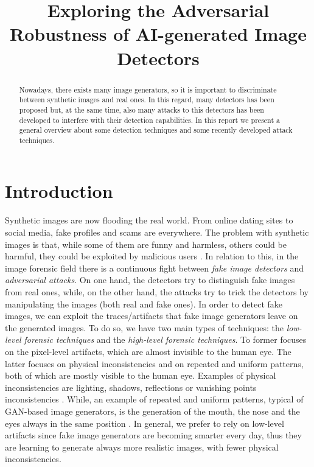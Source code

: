 \documentclass[conference]{IEEEtran} %
\begin{document}

\title{Exploring the Adversarial Robustness of AI-generated Image Detectors}

\author{
}

\maketitle

\begin{abstract}
    Nowadays, there exists many image generators, so it is important to discriminate between synthetic images and real ones. In this regard, many detectors has been proposed but, at the same time, also many attacks to this detectors has been developed to interfere with their detection capabilities. In this report we present a general overview about some detection techniques and some recently developed attack techniques. 
\end{abstract}

\section{Introduction}
    Synthetic images are now flooding the real world. From online dating sites to social media, fake profiles and scams are everywhere. The problem with synthetic images is that, while some of them are funny and harmless, others could be harmful, they could be exploited by malicious users \cite{carlini2020evading}. In relation to this, in the image forensic field there is a continuous fight between \textit{fake image detectors} and \textit{adversarial attacks}. On one hand, the detectors try to distinguish fake images from real ones, while, on the other hand, the attacks try to trick the detectors by manipulating the images (both real and fake ones). In order to detect fake images, we can exploit the traces/artifacts that fake image generators leave on the generated images. To do so, we have two main types of techniques: the \textit{low-level forensic techniques} and the \textit{high-level forensic techniques}. To former focuses on the pixel-level artifacts, which are almost invisible to the human eye. The latter focuses on physical inconsistencies and on repeated and uniform patterns, both of which are mostly visible to the human eye. Examples of physical inconsistencies are lighting, shadows, reflections or vanishing points inconsistencies \cite{farid2022lighting}\cite{farid2022perspective}. While, an example of repeated and uniform patterns, typical of GAN-based image generators, is the generation of the mouth, the nose and the eyes always in the same position \cite{mundra2023exposing}. In general, we prefer to rely on low-level artifacts since fake image generators are becoming smarter every day, thus they are learning to generate always more realistic images, with fewer physical inconsistencies.
\end{document}
